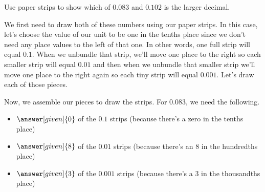 \documentclass{ximera}
\begin{document}
\begin{example}
Use paper strips to show which of $0.083$ and $0.102$ is the larger decimal.

We first need to draw both of these numbers using our paper strips. In this case, let's choose the value of our unit to be one in the tenths place since we don't need any place values to the left of that one. In other words, one full strip will equal $0.1$. When we unbundle that strip, we'll move one place to the right so each smaller strip will equal $0.01$ and then when we unbundle that smaller strip we'll move one place to the right again so each tiny strip will equal $0.001$. Let's draw each of those pieces.

\begin{image}
\end{image}
\begin{image}
\end{image}
\begin{image}
\end{image}

Now, we assemble our pieces to draw the strips. For $0.083$, we need the following.
\begin{itemize}
	\item $\answer[given]{0}$ of the $0.1$ strips (because there's a zero in the tenths place)
	\item $\answer[given]{8}$ of the $0.01$ strips (because there's an $8$ in the hundredths place)
	\item $\answer[given]{3}$ of the $0.001$ strips (because there's a $3$ in the thousandths place)
\end{itemize}


\end{example}
\end{document}

